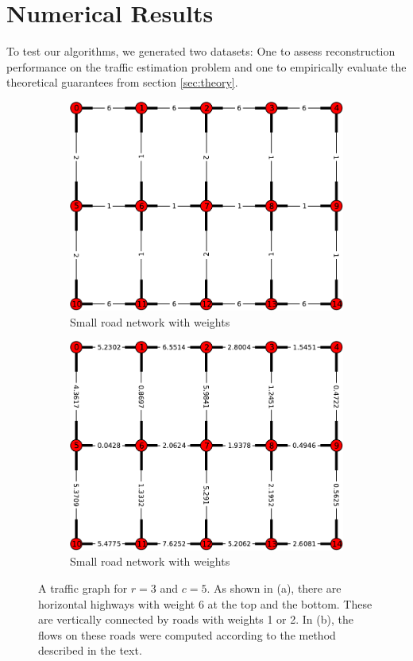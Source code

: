 \documentclass{article} %
\begin{document}
\section{Numerical Results}
To test our algorithms, we generated two datasets: One to assess reconstruction performance on the traffic estimation problem and one to empirically evaluate the theoretical guarantees from section \ref{sec:theory}.
\begin{figure}
  \centering
  \begin{subfigure}[h]{0.4\textwidth}
    \includegraphics[width=\textwidth]{figures/small-graph.pdf}
    \caption{Small road network with weights}
  \end{subfigure}
  \qquad
  \begin{subfigure}[h]{0.4\textwidth}
    \includegraphics[width=\textwidth]{figures/small-flow.pdf}
    \caption{Small road network with weights}
  \end{subfigure}
  \caption{A traffic graph for $r=3$ and $c=5$. As shown in (a), there are horizontal highways with weight $6$ at the top and the bottom. These are vertically connected by roads with weights 1 or 2. In (b), the flows on these roads were computed according to the method described in the text.}
\label{fig:graph-example}
\end{figure}
\end{document}

